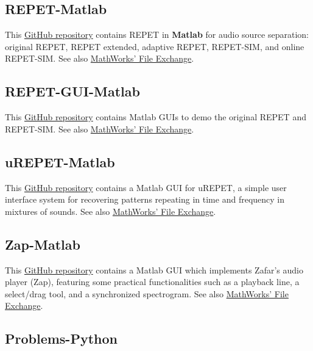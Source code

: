 \documentclass{article}
\begin{document}
\subsection{REPET-Matlab}
\label{ssec:repet-matlab}

This \href{https://github.com/zafarrafii/REPET-Matlab}{GitHub repository} contains REPET in \textbf{Matlab} for audio source separation: original REPET, REPET extended, adaptive REPET, REPET-SIM, and online REPET-SIM. See also \href{https://www.mathworks.com/matlabcentral/fileexchange/88803-repet-matlab}{MathWorks' File Exchange}.


\subsection{REPET-GUI-Matlab}
\label{ssec:repet-gui-matlab}

This \href{https://github.com/zafarrafii/REPET-GUI-Matlab}{GitHub repository} contains Matlab GUIs to demo the original REPET and REPET-SIM. See also \href{https://www.mathworks.com/matlabcentral/fileexchange/90736-repet-gui-matlab}{MathWorks' File Exchange}.


\subsection{uREPET-Matlab}
\label{ssec:urepet-matlab}

This \href{https://github.com/zafarrafii/uREPET-Matlab}{GitHub repository} contains a Matlab GUI for uREPET, a simple user interface system for recovering patterns repeating in time and frequency in mixtures of sounds. See also \href{https://www.mathworks.com/matlabcentral/fileexchange/90606-urepet-matlab}{MathWorks' File Exchange}.


\subsection{Zap-Matlab}
\label{ssec:zap-matlab}

This \href{https://github.com/zafarrafii/Zap-Matlab}{GitHub repository} contains a Matlab GUI which implements Zafar's audio player (Zap), featuring some practical functionalities such as a playback line, a select/drag tool, and a synchronized spectrogram. See also \href{https://www.mathworks.com/matlabcentral/fileexchange/90741-zap-matlab}{MathWorks' File Exchange}.


\subsection{Problems-Python}
\label{ssec:problems-python}
\end{document}
